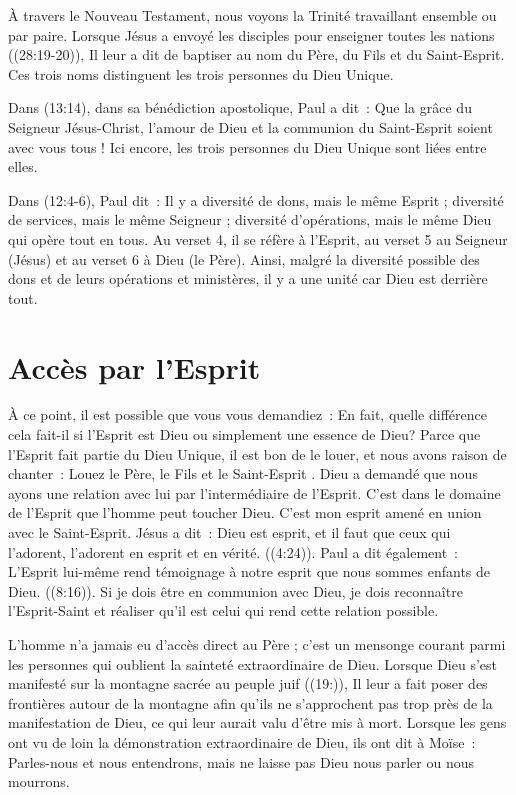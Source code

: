 À travers le Nouveau Testament, nous voyons la Trinité travaillant ensemble ou par paire. Lorsque Jésus a envoyé les disciples pour enseigner toutes les nations ((28:19-20)), Il leur a dit de baptiser au nom du Père, du Fils et du Saint-Esprit. Ces trois noms distinguent les trois personnes du Dieu Unique.

Dans (13:14), dans sa bénédiction apostolique, Paul a dit~: \og Que la grâce du Seigneur Jésus-Christ, l'amour de Dieu et la communion du Saint-Esprit soient avec vous tous ! \fg{} Ici encore, les trois personnes du Dieu Unique sont liées entre elles.

Dans (12:4-6), Paul dit~: \og Il y a diversité de dons, mais le même Esprit ; diversité de services, mais le même Seigneur ; diversité d'opérations, mais le même Dieu qui opère tout en tous. \fg{} Au verset 4, il se réfère à l'Esprit, au verset 5 au Seigneur (Jésus) et au verset 6 à Dieu (le Père). Ainsi, malgré la diversité possible des dons et de leurs opérations et ministères, il y a une unité car Dieu est derrière tout.


\section{Accès par l'Esprit}

À ce point, il est possible que vous vous demandiez~: \og En fait, quelle différence cela fait-il si l'Esprit est Dieu ou simplement une essence de Dieu? \fg{} Parce que l'Esprit fait partie du Dieu Unique, il est bon de le louer, et nous avons raison de chanter~: \og Louez le Père, le Fils et le Saint-Esprit \fg{}. Dieu a demandé que nous ayons une relation avec lui par l'intermédiaire de l'Esprit. C'est dans le domaine de l'Esprit que l'homme peut toucher Dieu. C'est mon esprit amené en union avec le Saint-Esprit. Jésus a dit~: \og Dieu est esprit, et il faut que ceux qui l'adorent, l'adorent en esprit et en vérité. \fg{} ((4:24)). Paul a dit également~: \og L'Esprit lui-même rend témoignage à notre esprit que nous sommes enfants de Dieu.  \fg{} ((8:16)). Si je dois être en communion avec Dieu, je dois reconnaître l'Esprit-Saint et réaliser qu'il est celui qui rend cette relation possible.

L'homme n'a jamais eu d'accès direct au Père ; c'est un mensonge courant parmi les personnes qui oublient la sainteté extraordinaire de Dieu. Lorsque Dieu s'est manifesté sur la montagne sacrée au peuple juif ((19:)), Il leur a fait poser des frontières autour de la montagne afin qu'ils ne s'approchent pas trop près de la manifestation de Dieu, ce qui leur aurait valu d'être mis à mort. Lorsque les gens ont vu de loin la démonstration extraordinaire de Dieu, ils ont dit à Moïse~: \og Parles-nous et nous entendrons, mais ne laisse pas Dieu nous parler ou nous mourrons. \fg{}

